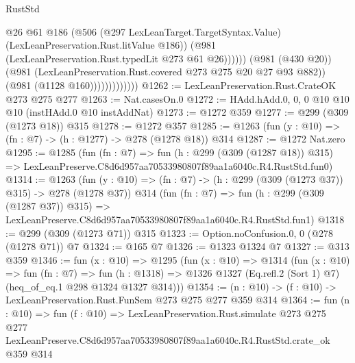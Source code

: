 \begin{lexlean}{RustStd}
\begin{coremodule}
                                  @26
                                  @61
                                  @186
                                  (@506
                                    (@297 LexLeanTarget.TargetSyntax.Value)
                                    (LexLeanPreservation.Rust.litValue @186))
                                  (@981 (LexLeanPreservation.Rust.typedLit @273 @61 @26))))))
                          (@981 (@430 @20))
                          (@981 (LexLeanPreservation.Rust.covered @273 @275 @20 @27 @93 @882))
                          (@981 (@1128 @160)))))))))))))
@1262 := LexLeanPreservation.Rust.CrateOK @273 @275 @277
@1263 := Nat.casesOn.{0}
@1272 := HAdd.hAdd.{0, 0, 0} @10 @10 @10 (instHAdd.{0} @10 instAddNat)
@1273 := @1272 @359
@1277 := @299 (@309 (@1273 @18)) @315
@1278 := @1272 @357
@1285 := @1263 (fun (y : @10) => (fn : @7) -> (h : @1277) -> @278 (@1278 @18)) @314
@1287 := @1272 Nat.zero
@1295 := @1285
    (fun (fn : @7) =>
    fun (h : @299 (@309 (@1287 @18)) @315) =>
    LexLeanPreserve.C8d6d957aa70533980807f89aa1a6040c.R4.RustStd.fun0)
@1314 := @1263
    (fun (y : @10) => (fn : @7) -> (h : @299 (@309 (@1273 @37)) @315) -> @278 (@1278 @37))
    @314
    (fun (fn : @7) =>
    fun (h : @299 (@309 (@1287 @37)) @315) =>
    LexLeanPreserve.C8d6d957aa70533980807f89aa1a6040c.R4.RustStd.fun1)
@1318 := @299 (@309 (@1273 @71)) @315
@1323 := Option.noConfusion.{0, 0} (@278 (@1278 @71)) @7
@1324 := @165 @7
@1326 := @1323 @1324 @7
@1327 := @313 @359
@1346 := fun (x : @10) =>
  @1295
    (fun (x : @10) =>
    @1314
      (fun (x : @10) =>
      fun (fn : @7) =>
      fun (h : @1318) =>
      @1326 @1327 (Eq.refl.{2} (Sort 1) @7) (heq_of_eq.{1} @298 @1324 @1327 @314)))
@1354 := (n : @10) -> (f : @10) -> LexLeanPreservation.Rust.FunSem @273 @275 @277 @359 @314
@1364 := fun (n : @10) =>
  fun (f : @10) =>
  LexLeanPreservation.Rust.simulate
    @273
    @275
    @277
    LexLeanPreserve.C8d6d957aa70533980807f89aa1a6040c.R4.RustStd.crate_ok
    @359
    @314
\end{coremodule}
\end{lexlean}
